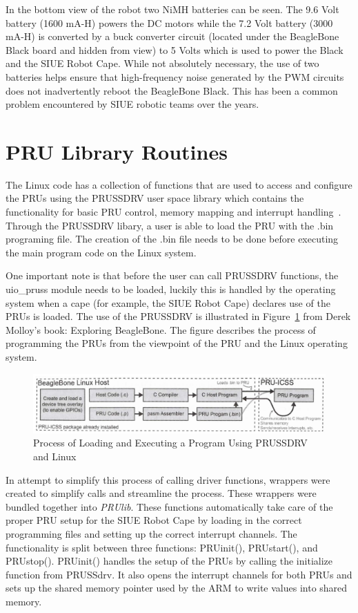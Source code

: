 \documentclass[12pt,oneside,final]{siuethesis}
\theoremstyle{definition}
\begin{document}
In the bottom view of the robot two NiMH batteries can be seen.  The 9.6 Volt battery (1600 mA-H) powers the DC motors while the 7.2 Volt battery (3000 mA-H) is converted by a buck converter circuit (located under the BeagleBone Black board and hidden from view) to 5 Volts which is used to power the Black and the SIUE Robot Cape. While not absolutely necessary, the use of two batteries helps ensure that high-frequency noise generated by the PWM circuits does not inadvertently reboot the BeagleBone Black.  This has been a common problem encountered by SIUE robotic teams over the years.

\section{PRU Library Routines}

The Linux code has a collection of functions that are used to access and configure the PRUs using the PRUSSDRV user space library which contains the functionality for basic PRU control, memory mapping and interrupt handling~\cite{PRUWIKI}. Through the PRUSSDRV libary, a user is able to load the PRU with the .bin programing file. The creation of the .bin file needs to be done before executing the main program code on the Linux system. 

One important note is that before the user can call PRUSSDRV functions, the uio\_pruss module needs to be loaded, luckily this is handled by the operating system when a cape (for example, the SIUE Robot Cape) declares use of the PRUs is loaded. The use of the PRUSSDRV is illustrated in Figure~\ref{fig:PRUSS Load} from Derek Molloy's book: Exploring BeagleBone. The figure describes the process of programming the PRUs from the viewpoint of the PRU and the Linux operating system.
 
\begin{figure}[htbp!]
 \centering
 \includegraphics[scale=1.25,keepaspectratio=true]{./images/PRUSSLoad.JPG}
 \caption{Process of Loading and Executing a Program Using PRUSSDRV and Linux}
 \label{fig:PRUSS Load}
\end{figure}

In attempt to simplify this process of calling driver functions, wrappers were created to simplify calls and streamline the process.  These wrappers were bundled together into \emph{PRUlib}. These functions automatically take care of the proper PRU setup for the SIUE Robot Cape by loading in the correct programming files and setting up the correct interrupt channels. The functionality is split between three functions: PRUinit(), PRUstart(), and PRUstop(). PRUinit() handles the setup of the PRUs by calling the initialize function from PRUSSdrv. It also opens the interrupt channels for both PRUs and sets up the shared memory pointer used by the ARM to write values into shared memory. 
\end{document}
